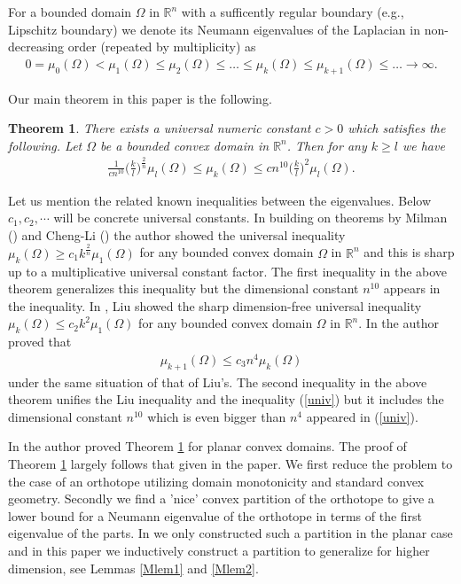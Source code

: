 \documentclass[12pt]{amsart}
\theoremstyle{plain}
\newtheorem{thm}{Theorem}[section]
\theoremstyle{remark}
\begin{document}
For a bounded domain $\Omega$ in $\mathbb{R}^n$ with a sufficently regular boundary (e.g., Lipschitz boundary) we denote its Neumann eigenvalues of the Laplacian in non-decreasing order (repeated by multiplicity) as 
\begin{align*}
     0=\mu_0(\Omega)<\mu_1(\Omega)\le\mu_2(\Omega)\le \dots  \le \mu_k(\Omega)\le \mu_{k+1}(\Omega)\le \dots \to\infty.
\end{align*}

Our main theorem in this paper is the following.
\begin{thm}\label{MTHM}There exists a universal numeric constant $c>0$ which satisfies the following. Let $\Omega$ be a bounded convex domain in $\mathbb{R}^n$. Then for any $k\geq l$ we have
    \begin{align*}
       \frac{1}{cn^{10}} \Big(\frac{k}{l}\Big)^{\frac{2}{n}}\mu_l(\Omega) \leq \mu_k(\Omega)\leq c n^{10} \Big(\frac{k}{l}\Big)^{2}\mu_l(\Omega).
    \end{align*}
\end{thm}

Let us mention the related known inequalities between the eigenvalues. Below $c_1,c_2,\cdots$ will be concrete universal constants. In \cite[Theorem 1.1 and Remark 1.1]{F3} building on theorems by Milman (\cite{Mi}) and Cheng-Li (\cite{CL}) the author showed the universal inequality $\mu_k(\Omega)\geq  c_1 k^{\frac{2}{n}}\mu_1(\Omega)$ for any bounded convex domain $\Omega$ in $\mathbb{R}^n$ and this is sharp up to a multiplicative universal constant factor. The first inequality in the above theorem generalizes this inequality but the dimensional constant $n^{10}$ appears in the inequality. 
In \cite[Theorem 1.1]{Liu}, Liu showed the sharp dimension-free universal inequality $\mu_k(\Omega)\leq c_2k^2\mu_1(\Omega)$ for any bounded convex domain $\Omega$ in $\mathbb{R}^n$.
In \cite[Theorem 1.2]{F2} the author proved that 
\begin{align}\label{univ}
    \mu_{k+1}(\Omega)\leq c_3 n^4\mu_k(\Omega)
\end{align}under the same situation of that of Liu's. The second inequality in the above theorem unifies the Liu inequality and the inequality (\ref{univ}) but it includes the dimensional constant $n^{10}$ which is even bigger than $n^4$ appeared in (\ref{univ}).

In \cite[Theorems 1.1 and 1.2]{F4} the author proved Theorem \ref{MTHM} for planar convex domains. The proof of Theorem \ref{MTHM} largely follows that given in the paper.
We first reduce the problem to the case of an orthotope utilizing domain monotonicity and standard convex geometry. 
Secondly we find a 'nice' convex partition of the orthotope to give a lower bound for a Neumann eigenvalue of the orthotope in terms of the first eigenvalue of the parts. In \cite{F4} we only constructed such a partition in the planar case and in this paper we inductively construct a partition to generalize for higher dimension, see Lemmas \ref{Mlem1} and \ref{Mlem2}.
\end{document}
